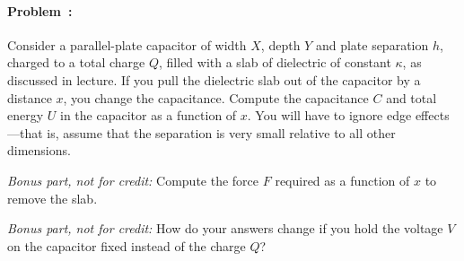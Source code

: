 \documentclass[12pt]{article}
\begin{document}
\paragraph{Problem~\theproblem:}%
Consider a parallel-plate capacitor of width $X$, depth $Y$ and plate
separation $h$, charged to a total charge $Q$, filled with a slab of
dielectric of constant $\kappa$, as discussed in lecture.  If you pull
the dielectric slab out of the capacitor by a distance $x$, you change
the capacitance. Compute the capacitance $C$ and
total energy $U$ in the capacitor as a function of $x$. You will have to
ignore edge effects---that is, assume that the separation is very small
relative to all other dimensions.

\textsl{Bonus part, not for credit:} Compute the
force $F$ required as a function of $x$ to remove the slab.

\textsl{Bonus part, not for credit:} How do your answers change if you
hold the voltage $V$ on the capacitor fixed instead of the charge $Q$?
\end{document}
